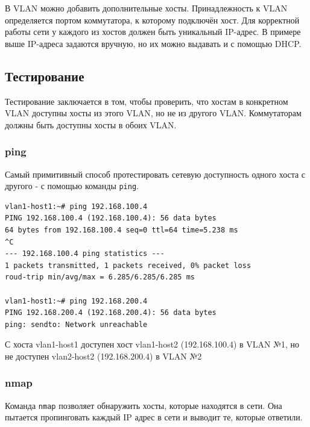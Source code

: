 \documentclass{article}
\begin{document}
В VLAN можно добавить дополнительные хосты. Принадлежность к VLAN определяется портом коммутатора, к которому подключён хост. Для корректной работы сети у каждого из хостов должен быть уникальный IP-адрес. В примере выше IP-адреса задаются вручную, но их можно выдавать и с помощью DHCP.

\subsection{Тестирование}
Тестирование заключается в том, чтобы проверить, что хостам в конкретном VLAN доступны хосты из этого VLAN, но не из другого VLAN. Коммутаторам должны быть доступны хосты в обоих VLAN.

\subsubsection{ping}
Самый примитивный способ протестировать сетевую доступность одного хоста с другого - с помощью команды \verb|ping|.
\begin{lstlisting}
vlan1-host1:~# ping 192.168.100.4
PING 192.168.100.4 (192.168.100.4): 56 data bytes
64 bytes from 192.168.100.4 seq=0 ttl=64 time=5.238 ms
^C
--- 192.168.100.4 ping statistics ---
1 packets transmitted, 1 packets received, 0% packet loss
roud-trip min/avg/max = 6.285/6.285/6.285 ms

vlan1-host1:~# ping 192.168.200.4
PING 192.168.200.4 (192.168.200.4): 56 data bytes
ping: sendto: Network unreachable
\end{lstlisting}

С хоста vlan1-host1 доступен хост vlan1-host2 (192.168.100.4) в VLAN №1, но не доступен vlan2-host2 (192.168.200.4) в VLAN №2

\subsubsection{nmap}
Команда \verb|nmap| позволяет обнаружить хосты, которые находятся в сети. Она пытается пропинговать каждый IP адрес в сети и выводит те, которые ответили.
\end{document}
